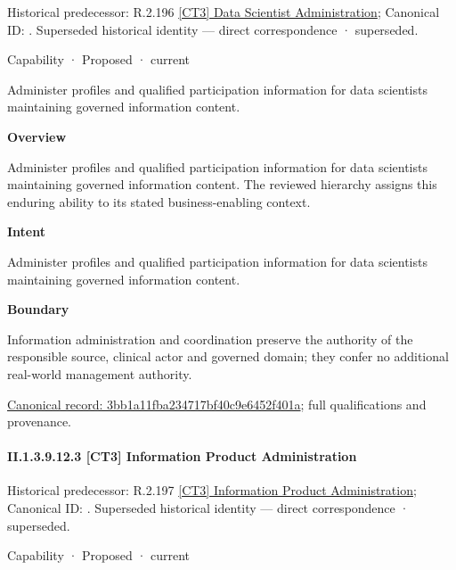 {\small Historical predecessor: R.2.196 \hyperref[element:1cb497aec93c4b82ba7f5b622813e54e]{[CT3] Data Scientist Administration}; Canonical ID: \texttt{}. Superseded historical identity — direct correspondence · superseded.}\par
\label{element:3bb1a11fba234717bf40c9e6452f401a}
{\small Capability · Proposed · current}\par

Administer profiles and qualified participation information for data scientists maintaining governed information content.



\textbf{Overview}



Administer profiles and qualified participation information for data scientists maintaining governed information content. The reviewed hierarchy assigns this enduring ability to its stated business-enabling context.



\textbf{Intent}



Administer profiles and qualified participation information for data scientists maintaining governed information content.



\textbf{Boundary}



Information administration and coordination preserve the authority of the responsible source, clinical actor and governed domain; they confer no additional real-world management authority.


{\footnotesize \href{../../../../continuum/strategy/capability/3bb1a11fba234717bf40c9e6452f401a.md}{Canonical record: 3bb1a11fba234717bf40c9e6452f401a}; full qualifications and provenance.}\par
\paragraph*{II.1.3.9.12.3 [CT3] Information Product Administration}
\label{navigation:II.1.3.9.12.3}

{\small Historical predecessor: R.2.197 \hyperref[element:5d9b7f8d2d7b41759b6d4931c1d2aaa2]{[CT3] Information Product Administration}; Canonical ID: \texttt{}. Superseded historical identity — direct correspondence · superseded.}\par
\label{element:b5a6a31855834ea58870ebb6c51ed4b0}
{\small Capability · Proposed · current}\par

